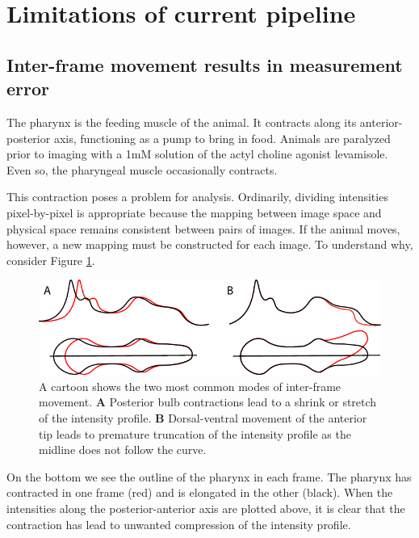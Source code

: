 \section{Limitations of current pipeline} \label{limitations}
\subsection{Inter-frame movement results in measurement error} \label{limitationMovement}

The pharynx is the feeding muscle of the animal. It contracts along its anterior-posterior axis, functioning as a pump to bring in food. Animals are paralyzed prior to imaging with a 1mM solution of the actyl choline agonist levamisole. Even so, the pharyngeal muscle occasionally contracts. 

This contraction poses a problem for analysis. Ordinarily, dividing intensities pixel-by-pixel is appropriate because the mapping between image space and physical space remains consistent between pairs of images. If the animal moves, however, a new mapping must be constructed for each image. To understand  why, consider Figure \ref{fig:MovementCartoon}.

\begin{figure}[ht]
    \centering
    \includegraphics{Figures/rendered_files/movement_cartoon}
    \decoRule
    \caption[Pharyngeal contractions lead to boundary issues]{A cartoon shows the two most common modes of inter-frame movement. \textbf{A} Posterior bulb contractions lead to a shrink or stretch of the intensity profile. \textbf{B} Dorsal-ventral movement of the anterior tip leads to premature truncation of the intensity profile as the midline does not follow the curve.}
    \label{fig:MovementCartoon}
\end{figure}

On the bottom we see the outline of the pharynx in each frame. The pharynx has contracted in one frame (red) and is elongated in the other (black). When the intensities along the posterior-anterior axis are plotted above, it is clear that the contraction has lead to unwanted compression of the intensity profile.

